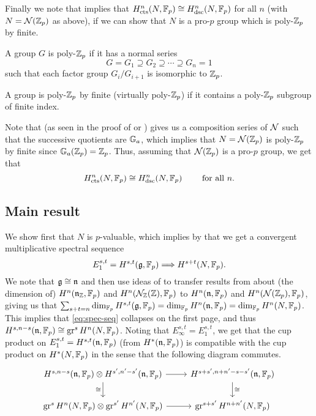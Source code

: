 Finally we note that \cite[Thm.~2.10]{CohComp} implies that $H_{\mathrm{cts}}^{n}(N,\mathbb{F}_{p}) \cong H_{\mathrm{dsc}}^{n}(N,\mathbb{F}_{p})$ for all $n$ (with $N = \mathcal{N}(\mathbb{Z}_{p})$ as above), if we can show that $N$ is a pro-$p$ group which is poly-$\mathbb{Z}_{p}$ by finite.
\begin{definition}
  A group $G$ is poly-$\mathbb{Z}_{p}$ if it has a normal series
  \begin{equation*}
    G = G_{1} \supseteq G_{2} \supseteq \cdots  \supseteq G_{n} = 1
  \end{equation*}
  such that each factor group $G_{i}/G_{i+1}$ is isomorphic to $\mathbb{Z}_{p}$.

  A group is poly-$\mathbb{Z}_{p}$ by finite (virtually poly-$\mathbb{Z}_{p}$) if it contains a poly-$\mathbb{Z}_{p}$ subgroup of finite index.
\end{definition}

Note that \cite[Prop.~5.1.16(2) and Cor.~5.2.5]{Con-book} (as seen in the proof of \cite[Cor.~5.2.13]{Con-book} or \cite[Thm.~5.4.3]{Con-book}) gives us a composition series of $\mathcal{N}$ such that the successive quotients are $\mathbb{G}_{a}$, which implies that $N = \mathcal{N}(\mathbb{Z}_{p})$ is poly-$\mathbb{Z}_{p}$ by finite since $\mathbb{G}_{a}(\mathbb{Z}_{p}) = \mathbb{Z}_{p}$. Thus, assuming that $\mathcal{N}(\mathbb{Z}_{p})$ is a pro-$p$ group, we get that
\begin{equation}
  \label{eq:coh-comp}
  H_{\mathrm{cts}}^{n}(N,\mathbb{F}_{p}) \cong H_{\mathrm{dsc}}^{n}(N,\mathbb{F}_{p}) \qquad \text{ for all } n.
\end{equation}


\subsection{Main result}%
\label{subsec:main-res}

We show first that $N$ is $p$-valuable, which implies by \cite[§6.1]{Sor} that we get a convergent multiplicative spectral sequence 
\begin{equation}
  \label{eq:spec-seq}
  E_1^{s,t} = H^{s,t}(\mathfrak{g},\mathbb{F}_p) \Longrightarrow H^{s+t}(N,\mathbb{F}_p).
\end{equation}
We note that $\mathfrak{g} \cong \mathfrak{n}$ and then use ideas of \cite[§7]{GK} to transfer results from \cite{PT} about (the dimension of) $H^n(\mathfrak{n}_{\mathbb{Z}},\mathbb{F}_p)$ and $H^n(\mathcal{N}_{\mathbb{Z}}(\mathbb{Z}),\mathbb{F}_p)$ to $H^n(\mathfrak{n},\mathbb{F}_p)$ and $H^n(\mathcal{N}(\mathbb{Z}_p),\mathbb{F}_p)$, giving us that $\sum_{s+t=n} \dim_{\mathbb{F}_p} H^{s,t}(\mathfrak{g},\mathbb{F}_p) = \dim_{\mathbb{F}_p} H^n(\mathfrak{n},\mathbb{F}_p) = \dim_{\mathbb{F}_p} H^n(N,\mathbb{F}_p)$. This implies that \eqref{eq:spec-seq} collapses on the first page, and thus $H^{s,n-s}(\mathfrak{n},\mathbb{F}_p) \cong \operatorname{gr}^s H^n(N,\mathbb{F}_p)$. Noting that $E_\infty^{s,t} = E_1^{s,t}$, we get that the cup product on $E_1^{s,t} = H^{s,t}(\mathfrak{n},\mathbb{F}_p)$ (from $H^*(\mathfrak{n},\mathbb{F}_p)$) is compatible with the cup product on $H^*(N,\mathbb{F}_p)$ in the sense that the following diagram commutes.
\[
  \begin{tikzcd}
    H^{s,n-s}(\lie{n},\F_p) \otimes H^{s',n'-s'}(\lie{n},\F_p) \ar[r] \ar[d,swap,"\iso"] & H^{s+s',n+n'-s-s'}(\lie{n},\F_p) \ar[d,"\iso"] \\
    \gr^s H^n(N,\F_p) \otimes \gr^{s'} H^{n'}(N,\F_p) \ar[r] & \gr^{s+s'}H^{n+n'}(N,\F_p)
  \end{tikzcd}
\]

